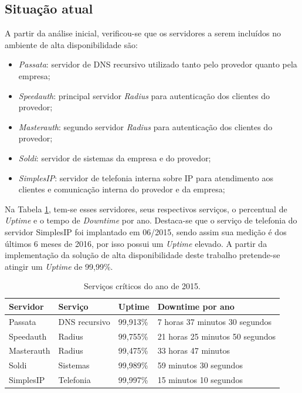 \subsection{Situação atual}
\label{section:maqservcrit}

A partir da análise inicial, verificou-se que os servidores a serem incluídos no ambiente de alta disponibilidade são:
\begin{itemize}
 \item \textit{Passata}: servidor de \ac{DNS} recursivo utilizado tanto pelo provedor quanto pela empresa;
 \item \textit{Speedauth}: principal servidor \textit{Radius} para autenticação dos clientes do provedor;
 \item \textit{Masterauth}: segundo servidor \textit{Radius} para autenticação dos clientes do provedor;
 \item \textit{Soldi}: servidor de sistemas da empresa e do provedor;
 \item \textit{SimplesIP}: servidor de telefonia interna sobre \ac{IP} para atendimento aos clientes e comunicação interna do provedor e da empresa;
\end{itemize}

\newpage
Na Tabela \ref{tab:dispservcrit}, tem-se esses servidores, seus respectivos serviços, o percentual de \textit{Uptime} e o tempo de 
\textit{Downtime} por ano. Destaca-se que o serviço de telefonia do servidor SimplesIP foi implantado em 06/2015, sendo assim sua medição é dos 
últimos 6 meses de 2016, por isso possui um \textit{Uptime} elevado.
A partir da implementação da solução de alta disponibilidade deste trabalho pretende-se atingir um \textit{Uptime} de 99,99\%.

\begin{table}[h!]
\caption{Serviços críticos do ano de 2015.}
\label{tab:dispservcrit}
\begin{center}
\begin{tabular}{|l|l|l|l|}\hline
\textbf{Servidor} & \textbf{Serviço} & \textbf{Uptime} & \textbf{Downtime por ano} \\\hline
Passata & DNS recursivo & 99,913\% & 7 horas 37 minutos 30 segundos \\\hline
Speedauth & Radius & 99,755\% & 21 horas 25 minutos 50 segundos \\\hline
Masterauth & Radius & 99,475\% & 33 horas 47 minutos \\\hline
Soldi & Sistemas & 99,989\% & 59 minutos 30 segundos \\\hline
SimplesIP & Telefonia & 99,997\% & 15 minutos 10 segundos \\\hline %
\end{tabular}
\end{center}
\end{table}

